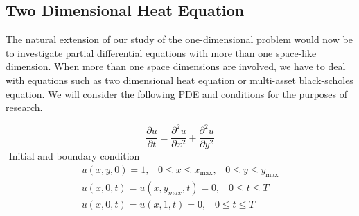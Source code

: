 \documentclass[12pt, oneside]{book}
\theoremstyle{plain}
\theoremstyle{definition}
\begin{document}
\subsection{Two Dimensional Heat Equation}
The natural extension of our study of the one-dimensional problem would now be to investigate partial differential equations with more than one space-like dimension. When more than one space dimensions are involved, we have to deal with equations such as two dimensional heat equation or multi-asset black-scholes equation.  We will consider the following PDE and conditions for the purposes of research.

\begin{equation}
\frac{\partial u}{\partial t} = \frac{\partial^2 u}{\partial x^2} +\frac{\partial^2 u}{\partial y^2}
\end{equation}$  $
Initial and boundary condition
\begin{eqnarray} \label{HeatTwoBase}
u(x,y,0) = 1, \hspace{10pt} 0 \leq x \leq x_{\max}, \hspace{10pt} 0 \leq y \leq y_{\max} \\[10pt]
u(x, 0, t) = u(x, y_{max}, t) = 0, \hspace{10pt} 0 \leq t \leq T \\[10pt]
u(x, 0, t) = u(x, 1, t) = 0 , \hspace{10pt} 0 \leq t \leq T
\end{eqnarray}
\end{document}
